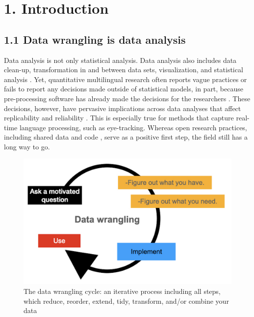\section{1. Introduction}
\subsection{1.1 Data wrangling is data analysis}

Data analysis is not only statistical analysis. Data analysis also includes data clean-up, transformation in and between data sets, visualization, and statistical analysis \parencite{Wickham2017R}. Yet, quantitative multilingual research often reports vague practices or fails to report any decisions made outside of statistical models, in part, because pre-processing software has already made the decisions for the researchers \parencite{Prystauka_Altmann_Rothman_2023}. These decisions, however, have pervasive implications across data analyses that affect replicability and reliability \parencite{ana_flex}. This is especially true for methods that capture real-time language processing, such as eye-tracking. Whereas open research practices, including shared data and code \parencite{Bolibaugh}, serve as a positive first step, the field still has a long way to go. 

\begin{figure}[h]
    \centering
    \includegraphics[scale=.3]{figures/data_wrangling.png}
    \caption{The data wrangling cycle: an iterative process including all steps, which reduce, reorder, extend, tidy, transform, and/or combine your data}
    \label{fig:data_wrangling}
\end{figure}


